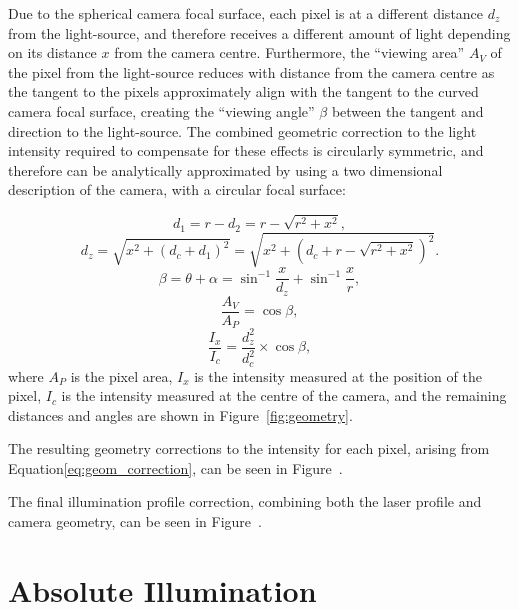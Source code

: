 Due to the spherical camera focal surface, each pixel is at a different distance $d_z$ from the light-source, and therefore receives a different amount of light depending on its distance $x$ from the camera centre. Furthermore, the ``viewing area'' $A_V$ of the pixel from the light-source reduces with distance from the camera centre as the tangent to the pixels approximately align with the tangent to the curved camera focal surface, creating the ``viewing angle'' $\beta$ between the tangent and direction to the light-source. The combined geometric correction to the light intensity required to compensate for these effects is circularly symmetric, and therefore can be analytically approximated by using a two dimensional description of the camera, with a circular focal surface:

\begin{equation} \label{eq:geom_distance1}
d_1 = r - d_2 = r - \sqrt{r^2 + x^2},
\end{equation}
\begin{equation} \label{eq:geom_distance2}
d_z = \sqrt{x^2 + (d_c + d_1)^2} = \sqrt{x^2 + (d_c + r - \sqrt{r^2 + x^2})^2}.
\end{equation}
\begin{equation} \label{eq:viewing_area1}
\beta = \theta + \alpha = \sin^{-1}{\frac{x}{d_z}} + \sin^{-1}{\frac{x}{r}},
\end{equation}
\begin{equation} \label{eq:viewing_area2}
\frac{A_V}{A_P} = \cos{\beta},
\end{equation}
\begin{equation} \label{eq:geom_correction}
\frac{I_x}{I_c} = \frac{d_z^2}{d_c^2} \times \cos{\beta},
\end{equation}
where $A_P$ is the pixel area, $I_x$ is the intensity measured at the position of the pixel, $I_c$ is the intensity measured at the centre of the camera, and the remaining distances and angles are shown in Figure~\ref{fig:geometry}.

The resulting geometry corrections to the intensity for each pixel, arising from Equation\ref{eq:geom_correction}, can be seen in Figure~. 

The final illumination profile correction, combining both the laser profile and camera geometry, can be seen in Figure~.

\section{Absolute Illumination} \label{section:absolute_illumination}

